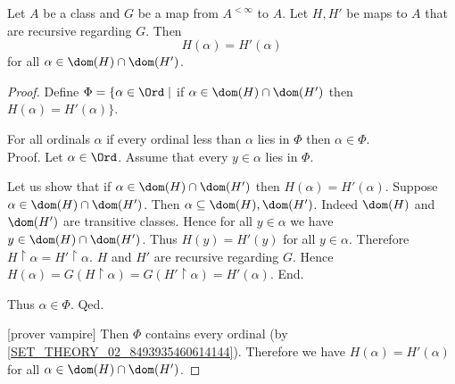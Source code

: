 \documentclass[../../set-theory/set-theory.tex]{subfiles}
\begin{document}
  \begin{forthel}
    \begin{proposition}
      Let $A$ be a class and $G$ be a map from $A^{< \infty}$ to $A$.
      Let $H, H'$ be maps to $A$ that are recursive regarding $G$.
      Then \[ H(\alpha) = H'(\alpha) \]
      for all $\alpha \in \dom(H) \cap \dom(H')$.
    \end{proposition}
    \begin{proof}
      Define $\Phi = \{ \alpha \in \Ord \mid$ if
      $\alpha \in \dom(H) \cap \dom(H')$ then $H(\alpha) = H'(\alpha) \}$.

      For all ordinals $\alpha$ if every ordinal less than $\alpha$ lies in
      $\Phi$ then $\alpha \in \Phi$. \\
      Proof.
        Let $\alpha \in \Ord$.
        Assume that every $y \in \alpha$ lies in $\Phi$.

        Let us show that if $\alpha \in \dom(H) \cap \dom(H')$ then
        $H(\alpha) = H'(\alpha)$.
          Suppose $\alpha \in \dom(H) \cap \dom(H')$.
          Then $\alpha \subseteq \dom(H), \dom(H')$.
          Indeed $\dom(H)$ and $\dom(H')$ are transitive classes.
          Hence for all $y \in \alpha$ we have $y \in \dom(H) \cap \dom(H')$.
          Thus $H(y) = H'(y)$ for all $y \in \alpha$.
          Therefore $H \restriction \alpha = H' \restriction \alpha$.
          $H$ and $H'$ are recursive regarding $G$.
          Hence $H(\alpha)
            = G(H \restriction \alpha)
            = G(H' \restriction \alpha)
            = H'(\alpha)$.
        End.

        Thus $\alpha \in \Phi$.
      Qed.

      [prover vampire]
      Then $\Phi$ contains every ordinal (by
      \cref{SET_THEORY_02_8493935460614144}).
      Therefore we have $H(\alpha) = H'(\alpha)$ for all
      $\alpha \in \dom(H) \cap \dom(H')$.
    \end{proof}
  \end{forthel}
\end{document}
